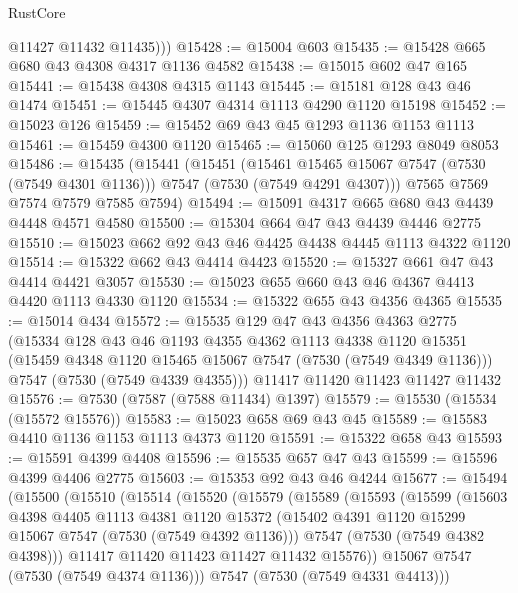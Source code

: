 \begin{lexlean}{RustCore}
\begin{coremodule}
          @11427
          @11432
          @11435)))
@15428 := @15004 @603
@15435 := @15428 @665 @680 @43 @4308 @4317 @1136 @4582
@15438 := @15015 @602 @47 @165
@15441 := @15438 @4308 @4315 @1143
@15445 := @15181 @128 @43 @46 @1474
@15451 := @15445 @4307 @4314 @1113 @4290 @1120 @15198
@15452 := @15023 @126
@15459 := @15452 @69 @43 @45 @1293 @1136 @1153 @1113
@15461 := @15459 @4300 @1120
@15465 := @15060 @125 @1293 @8049 @8053
@15486 := @15435
    (@15441
      (@15451
        (@15461 @15465 @15067 @7547 (@7530 (@7549 @4301 @1136)))
        @7547
        (@7530 (@7549 @4291 @4307)))
      @7565
      @7569
      @7574
      @7579
      @7585
      @7594)
@15494 := @15091 @4317 @665 @680 @43 @4439 @4448 @4571 @4580
@15500 := @15304 @664 @47 @43 @4439 @4446 @2775
@15510 := @15023 @662 @92 @43 @46 @4425 @4438 @4445 @1113 @4322 @1120
@15514 := @15322 @662 @43 @4414 @4423
@15520 := @15327 @661 @47 @43 @4414 @4421 @3057
@15530 := @15023 @655 @660 @43 @46 @4367 @4413 @4420 @1113 @4330 @1120
@15534 := @15322 @655 @43 @4356 @4365
@15535 := @15014 @434
@15572 := @15535
    @129
    @47
    @43
    @4356
    @4363
    @2775
    (@15334
      @128
      @43
      @46
      @1193
      @4355
      @4362
      @1113
      @4338
      @1120
      @15351
      (@15459 @4348 @1120 @15465 @15067 @7547 (@7530 (@7549 @4349 @1136)))
      @7547
      (@7530 (@7549 @4339 @4355)))
    @11417
    @11420
    @11423
    @11427
    @11432
@15576 := @7530 (@7587 (@7588 @11434) @1397)
@15579 := @15530 (@15534 (@15572 @15576))
@15583 := @15023 @658 @69 @43 @45
@15589 := @15583 @4410 @1136 @1153 @1113 @4373 @1120
@15591 := @15322 @658 @43
@15593 := @15591 @4399 @4408
@15596 := @15535 @657 @47 @43
@15599 := @15596 @4399 @4406 @2775
@15603 := @15353 @92 @43 @46 @4244
@15677 := @15494
    (@15500
      (@15510
        (@15514
          (@15520
            (@15579
              (@15589
                (@15593
                  (@15599
                    (@15603
                      @4398
                      @4405
                      @1113
                      @4381
                      @1120
                      @15372
                      (@15402 @4391 @1120 @15299 @15067 @7547 (@7530 (@7549 @4392 @1136)))
                      @7547
                      (@7530 (@7549 @4382 @4398)))
                    @11417
                    @11420
                    @11423
                    @11427
                    @11432
                    @15576))
                @15067
                @7547
                (@7530 (@7549 @4374 @1136)))
              @7547
              (@7530 (@7549 @4331 @4413)))

\end{coremodule}
\end{lexlean}
